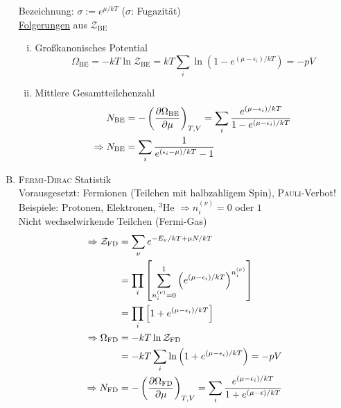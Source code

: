 \begin{enumerate}[A)]
    Bezeichnung: $\sigma := e^{\mu / kT}$ ($\sigma$: Fugazität)\\
    \underline{Folgerungen} aus $\mathcal{Z}_\text{BE}$
    \begin{enumerate}[i)]
        \item Großkanonisches Potential
        \begin{equation}
            \Omega_\text{BE} = - k T \ln \mathcal{Z}_\text{BE} = k T \sum_i \ln \left( 1 - e^{(\mu - \epsilon_i) / k T} \right) = - p V
        \end{equation}
        \item Mittlere Gesamtteilchenzahl
        \begin{equation}
            \begin{split}
                N_\text{BE} &= - \left( \frac{\partial \Omega_\text{BE}}{\partial \mu} \right)_{T, V} = \sum_i \frac{e^{(\mu - \epsilon_i) / k T}}{1 - e^{(\mu - \epsilon_i) / k T}} \\
                \Rightarrow N_\text{BE} &= \sum_i \frac{1}{e^{(\epsilon_i - \mu) / k T} - 1}
            \end{split}
        \end{equation}
    \end{enumerate}
    \item \textsc{Fermi-Dirac} Statistik \\
    Vorausgesetzt: Fermionen (Teilchen mit halbzahligem Spin), \textsc{Pauli}-Verbot! \\
    Beispiele: Protonen, Elektronen, $^3$He $\Rightarrow n_i^{(\nu)} = 0$ oder $1$ \\
    Nicht wechselwirkende Teilchen (Fermi-Gas)
    \begin{equation}
        \begin{split}
            \Rightarrow \mathcal{Z}_\text{FD} &= \sum_\nu e^{-E_\nu / k T + \mu N / k T} \\
            &= \prod_i \left[ \sum_{n_i^{(\nu)} = 0}^1 \left( e^{(\mu - \epsilon_i) / k T} \right)^{n_i^{(\nu)}}  \right] \\
            &= \prod_i \left[ 1 + e^{(\mu - \epsilon_i) / k T} \right] \\
            \Rightarrow \Omega_\text{FD} &= - k T \ln \mathcal{Z}_\text{FD} \\
            &= - k T \sum_i \ln \left( 1 + e^{(\mu - \epsilon_i) / kT} \right) = - p V \\
            \Rightarrow N_\text{FD} &= - \pdi{\Omega_\text{FD}}{\mu}{T, V} = \sum_i \frac{e^{(\mu - \epsilon_i) / k T}}{1 + e^{(\mu - \epsilon) / k T}} \\

\end{split}
\end{equation}
\end{enumerate}

